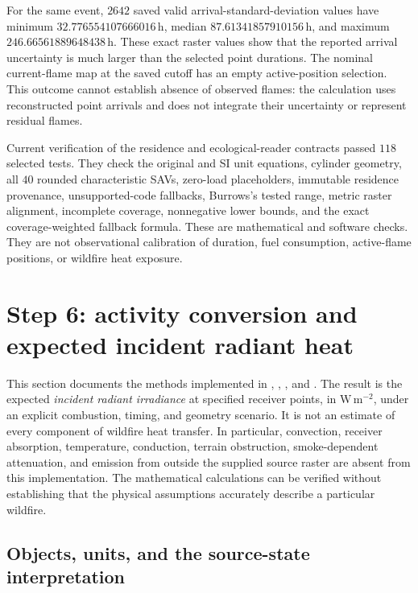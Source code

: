 \documentclass[11pt,a4paper]{article}
\begin{document}
For the same event, $2642$ saved valid arrival-standard-deviation values have
minimum $32.776554107666016\,\mathrm h$, median
$87.61341857910156\,\mathrm h$, and maximum
$246.66561889648438\,\mathrm h$. These exact raster values show that the
reported arrival uncertainty is much larger than the selected point durations.
The nominal current-flame map at the saved cutoff has an empty active-position
selection. This outcome cannot establish absence of observed flames: the
calculation uses reconstructed point arrivals and does not integrate their
uncertainty or represent residual flames.

Current verification of the residence and ecological-reader contracts passed
$118$ selected tests. They check the original and SI unit equations, cylinder
geometry, all $40$ rounded characteristic SAVs, zero-load placeholders,
immutable residence provenance, unsupported-code fallbacks, Burrows's tested
range, metric raster alignment, incomplete coverage, nonnegative lower bounds,
and the exact coverage-weighted fallback formula. These are mathematical and
software checks. They are not observational calibration of duration, fuel
consumption, active-flame positions, or wildfire heat exposure.

\section{Step 6: activity conversion and expected incident radiant heat}
\label{sec:heat}

This section documents the methods implemented in
, ,
, and .
The result is the expected \emph{incident radiant irradiance} at specified
receiver points, in $\mathrm{W\,m^{-2}}$, under an explicit combustion, timing,
and geometry scenario. It is not an estimate of every component of wildfire
heat transfer. In particular, convection, receiver absorption, temperature,
conduction, terrain obstruction, smoke-dependent attenuation, and emission
from outside the supplied source raster are absent from this implementation.
The mathematical calculations can be verified without establishing that the
physical assumptions accurately describe a particular wildfire.\cite{codeheat}

\subsection{Objects, units, and the source-state interpretation}
\label{sec:heat-objects}
\end{document}
